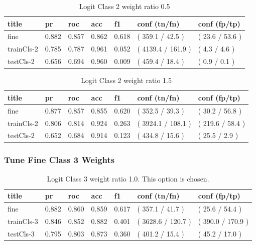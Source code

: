 \documentclass[ms]{nuthesis}
\begin{document}
\FloatBarrier
\begin{table}[H]
\centering
\caption{Logit Class 2 weight ratio 0.5}
\label{tab:LogitCls2-Wtp5}
\begin{tabular}{|l||l||l||l||l||l||l|}\toprule
title & pr & roc & acc & f1 & conf (tn/fn) & conf (fp/tp) \\ \midrule
fine & 0.882 & 0.857 & 0.862 & 0.618 & ( 359.1 / 42.5 ) & ( 23.6 / 53.6 ) \\
trainCls-2 & 0.785 & 0.787 & 0.961 & 0.052 & ( 4139.4 / 161.9 ) & ( 4.3 / 4.6 ) \\
testCls-2 & 0.656 & 0.694 & 0.960 & 0.009 & ( 459.4 / 18.4 ) & ( 0.9 / 0.1 ) \\ \bottomrule
\end{tabular}
\end{table}
\FloatBarrier

\FloatBarrier
\begin{table}[H]
\centering
\caption{Logit Class 2 weight ratio 1.5}
\label{tab:LogRegCls2-Wt1p5}
\begin{tabular}{|l||l||l||l||l||l||l|}\toprule
title & pr & roc & acc & f1 & conf (tn/fn) & conf (fp/tp) \\ \midrule
fine & 0.877 & 0.857 & 0.855 & 0.620 & ( 352.5 / 39.3 ) & ( 30.2 / 56.8 ) \\
trainCls-2 & 0.806 & 0.814 & 0.924 & 0.263 & ( 3924.1 / 108.1 ) & ( 219.6 / 58.4 ) \\
testCls-2 & 0.652 & 0.684 & 0.914 & 0.123 & ( 434.8 / 15.6 ) & ( 25.5 / 2.9 ) \\ \bottomrule
\end{tabular}
\end{table}
\FloatBarrier


\subsubsection{Tune Fine Class 3 Weights}
\FloatBarrier
\begin{table}[H]
\centering
\caption{Logit Class 3 weight ratio 1.0. This option is chosen.}
\label{tab:LogRegCls3-Wt1}
\begin{tabular}{|l||l||l||l||l||l||l|}\toprule
title & pr & roc & acc & f1 & conf (tn/fn) & conf (fp/tp) \\ \midrule
fine & 0.882 & 0.860 & 0.859 & 0.617 & ( 357.1 / 41.7 ) & ( 25.6 / 54.4 ) \\
trainCls-3 & 0.846 & 0.852 & 0.882 & 0.401 & ( 3628.6 / 120.7 ) & ( 390.0 / 170.9 ) \\
testCls-3 & 0.795 & 0.803 & 0.873 & 0.360 & ( 401.2 / 15.4 ) & ( 45.2 / 17.0 ) \\ \bottomrule
\end{tabular}
\end{table}
\FloatBarrier
\end{document}
